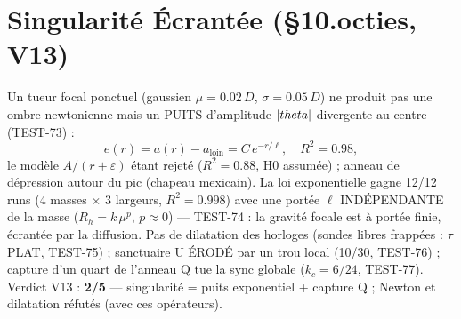 \documentclass[11pt,a4paper]{article}
\begin{document}
\section{Singularité Écrantée (\S10.octies, V13)}
Un tueur focal ponctuel (gaussien $\mu = 0.02\,D$,
$\sigma = 0.05\,D$) ne produit pas une ombre newtonienne mais un
PUITS d'amplitude $|\\theta|$ divergente au centre (TEST-73) :
\begin{equation}
e(r) = a(r) - a_{\mathrm{loin}} = C\,e^{-r/\ell},
\quad R^2 = 0.98,
\end{equation}
le modèle $A/(r+\varepsilon)$ étant rejeté ($R^2 = 0.88$, H0
assumée) ; anneau de dépression autour du pic (chapeau mexicain).
La loi exponentielle gagne 12/12 runs (4 masses $\times$ 3
largeurs, $R^2 = 0.998$) avec une portée $\ell$ INDÉPENDANTE de la
masse ($R_h = k\,\mu^p$, $p \approx 0$) --- TEST-74 : la gravité
focale est à portée finie, écrantée par la diffusion.
Pas de dilatation des horloges (sondes libres frappées : $\tau$
PLAT, TEST-75) ; sanctuaire U ÉRODÉ par un trou local (10/30,
TEST-76) ; capture d'un quart de l'anneau Q tue la sync globale
($k_c = 6/24$, TEST-77).
Verdict V13 : \textbf{2/5} — singularité = puits exponentiel +
capture Q ; Newton et dilatation réfutés (avec ces opérateurs).
\end{document}
